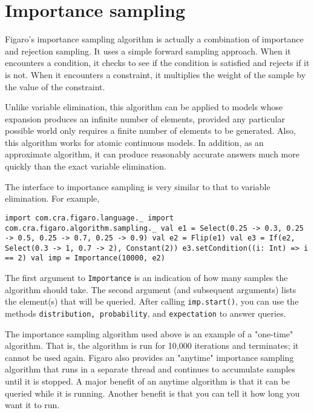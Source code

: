 \section{Importance sampling}

Figaro's importance sampling algorithm is actually a combination of importance and rejection sampling. It uses a simple forward sampling approach. When it encounters a condition, it checks to see if the condition is satisfied and rejects if it is not. When it encounters a constraint, it multiplies the weight of the sample by the value of the constraint.

Unlike variable elimination, this algorithm can be applied to models whose expansion produces an infinite number of elements, provided any particular possible world only requires a finite number of elements to be generated. Also, this algorithm works for atomic continuous models. In addition, as an approximate algorithm, it can produce reasonably accurate answers much more quickly than the exact variable elimination.

The interface to importance sampling is very similar to that to variable elimination. For example,

\begin{flushleft}
\texttt{import com.cra.figaro.language.\_
\newline import com.cra.figaro.algorithm.sampling.\_
\newline
\newline val e1 = Select(0.25 -> 0.3, 0.25 -> 0.5, 0.25 -> 0.7, 0.25 -> 0.9)
\newline val e2 = Flip(e1)
\newline val e3 = If(e2, Select(0.3 -> 1, 0.7 -> 2), Constant(2))
\newline e3.setCondition((i: Int) => i == 2)
\newline 
\newline val imp = Importance(10000, e2) }
\end{flushleft}

The first argument to \texttt{Importance} is an indication of how many samples the algorithm should take. The second argument (and subsequent arguments) lists the element(s) that will be queried. After calling \texttt{imp.start()}, you can use the methods \texttt{distribution, probabil\-ity}, and \texttt{expectation} to answer queries.

The importance sampling algorithm used above is an example of a "one-time" algorithm. That is, the algorithm is run for 10,000 iterations and terminates; it cannot be used again. Figaro also provides an "anytime" importance sampling algorithm that runs in a separate thread and continues to accumulate samples until it is stopped. A major benefit of an anytime algorithm is that it can be queried while it is running. Another benefit is that you can tell it how long you want it to run.

